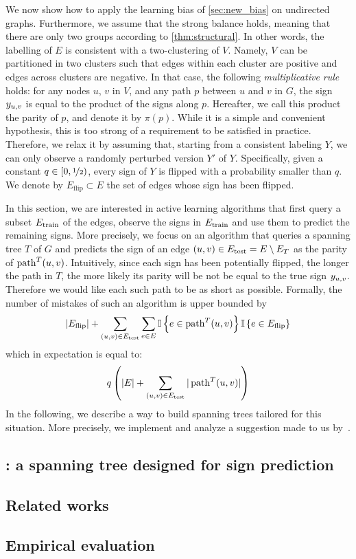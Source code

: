 We now show how to apply the learning bias of \autoref{sec:new_bias} on undirected graphs.
Furthermore, we assume that the strong balance holds, meaning that there are only two groups
according to \autoref{thm:structural}. In other words, the labelling of $E$ is consistent with a
two-clustering of $V$. Namely, $V$ can be partitioned in two clusters such that edges within each
cluster are positive and edges across clusters are negative.
In that case, the following
\emph{multiplicative rule} holds: for any nodes $u$, $v$ in $V$, and any path $p$ between $u$ and
$v$ in $G$, the sign $y_{u, v}$ is equal to the product of the signs along $p$. Hereafter, we call this
product the parity of $p$, and denote it by $\pi(p)$.
While it is a simple and convenient hypothesis, this is too strong
of a requirement to be satisfied in practice. Therefore, we relax it by assuming that, starting from
a consistent labeling $Y$, we can only observe a randomly perturbed version $Y'$ of $Y$.
Specifically, given a constant $q\in [0, \nicefrac{1}{2})$, every sign of $Y$ is flipped with a
probability smaller than $q$. We denote by $E_{\mathrm{flip}} \subset E$ the set of edges whose sign
has been flipped.

In this section, we are interested in active learning algorithms that first query a subset
$E_{\mathrm{train}}$ of the edges, observe the signs in $E_{\mathrm{train}}$ and use them to predict the remaining signs.
More precisely, we focus on an algorithm that queries a spanning tree $T$ of $G$ and predicts the
sign of an edge $(u,v) \in E_{\mathrm{test}} = E \setminus E_T$ as the parity of $\operatorname{path}^T(u, v)$. Intuitively, since
each sign has been potentially flipped, the longer the path in $T$, the more likely its parity will
be not be equal to the true sign $y_{u, v}{}$. Therefore we would like each such path to be as short as
possible.
Formally, the number of mistakes of such an algorithm is upper bounded by~\autocite[Equation
(3)]{Cesa-Bianchi2012b}
\begin{equation*}
  |E_{\mathrm{flip}}| + \sum_{(u,v) \in E_{\mathrm{test}}}
  \sum_{e\in E} \mathbb{I}\left\{{e \in \operatorname{path}^T(u, v)}\right\} \mathbb{I}\left\{{e \in E_{\mathrm{flip}}}\right\}
\end{equation*}
which in expectation is equal to:
\begin{equation}
  \label{eq:stretch_mistakes}
  q\left(|E| + \sum_{(u,v) \in E_{\mathrm{test}}} |\operatorname{path}^T(u, v)| \right)
\end{equation}
In the following, we describe a way to build spanning trees tailored for this situation. More
precisely, we implement and analyze a suggestion made to us by~\autocite{gtxFabio}.

\subsection{\gtx{}: a spanning tree designed for sign prediction}
\label{sub:gtx_algo}



\subsection{Related works}
\label{sub:gtx_related_works}



\subsection{Empirical evaluation}
\label{sub:gtx_empirical_evaluation}


